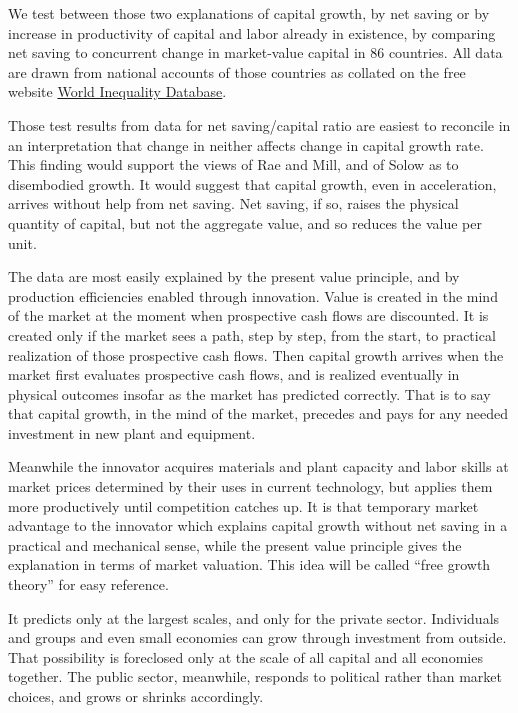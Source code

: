 \documentclass[a4paper,fleqn]{latex_styles/cas-sc}
\begin{document}
We test between those two explanations of capital growth, by net
saving or by increase in productivity of capital and labor already
in existence, by comparing net saving to concurrent change in
market-value capital in 86 countries. All data are drawn from national accounts
of those countries as collated on the free website \href{https://wid.world/}{World Inequality Database}.

Those test results from data for net saving/capital ratio 
are easiest to reconcile in an interpretation that change in neither affects
change in capital growth rate.
This finding would support the views of Rae and Mill, and of
Solow as to disembodied growth. It would suggest that capital growth, even in
acceleration, arrives without help from net saving.
Net saving, if so, raises the physical quantity of capital, but not the
aggregate value, and so reduces the value per unit.

The data are most easily explained by the present value principle,
and by production efficiencies enabled through innovation. Value is
created in the mind of the market at the moment when prospective cash
flows are discounted. It is created only if the market sees a path, step
by step, from the start, to practical realization of those prospective
cash flows. Then capital growth arrives when the market first evaluates
prospective cash flows, and is realized eventually in physical outcomes
insofar as the market has predicted correctly. That is to say that capital
growth, in the mind of the market, precedes and pays for any needed investment
in new plant and equipment.

Meanwhile the innovator
acquires materials and plant capacity and labor skills at market prices
determined by their uses in current technology, but applies them more
productively until competition catches up. It is that temporary market
advantage to the innovator which explains capital growth without net
saving in a practical and mechanical sense, while the present value
principle gives the explanation in terms of market valuation. This idea
will be called ``free growth theory'' for easy reference.

It predicts only at the largest scales, and only for the private sector.
Individuals and groups and even small economies can grow through
investment from outside. That possibility is foreclosed only at the
scale of all capital and all economies together. The public sector,
meanwhile, responds to political rather than market choices, and grows
or shrinks accordingly.
\end{document}
